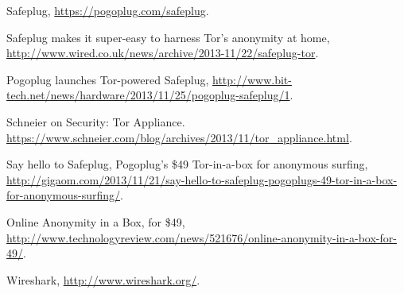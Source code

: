 \begin{thebibliography}{99}

 Safeplug, \url{https://pogoplug.com/safeplug}.

 Safeplug makes it super-easy to harness Tor's anonymity at home, \url{http://www.wired.co.uk/news/archive/2013-11/22/safeplug-tor}.

 Pogoplug launches Tor-powered Safeplug, \url{http://www.bit-tech.net/news/hardware/2013/11/25/pogoplug-safeplug/1}.

 Schneier on Security: Tor Appliance.  \url{https://www.schneier.com/blog/archives/2013/11/tor_appliance.html}.

 Say hello to Safeplug, Pogoplug’s \$49 Tor-in-a-box for anonymous surfing, \url{http://gigaom.com/2013/11/21/say-hello-to-safeplug-pogoplugs-49-tor-in-a-box-for-anonymous-surfing/}.

 Online Anonymity in a Box, for \$49, \url{http://www.technologyreview.com/news/521676/online-anonymity-in-a-box-for-49/}.

 Wireshark, \url{http://www.wireshark.org/}. 

\end{thebibliography}
